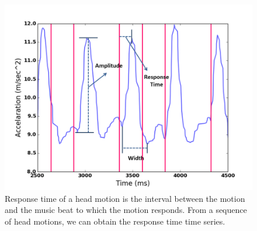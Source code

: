 
\begin{figure}[t]
\includegraphics[width=.75\columnwidth]{figure/waveform_resp.png}
\centering
\caption{\label{fig:waveform}Response time of a head motion is the interval between the motion and the music beat to which the motion responds. From a sequence of head motions, we can obtain the response time time series.}
\end{figure}


